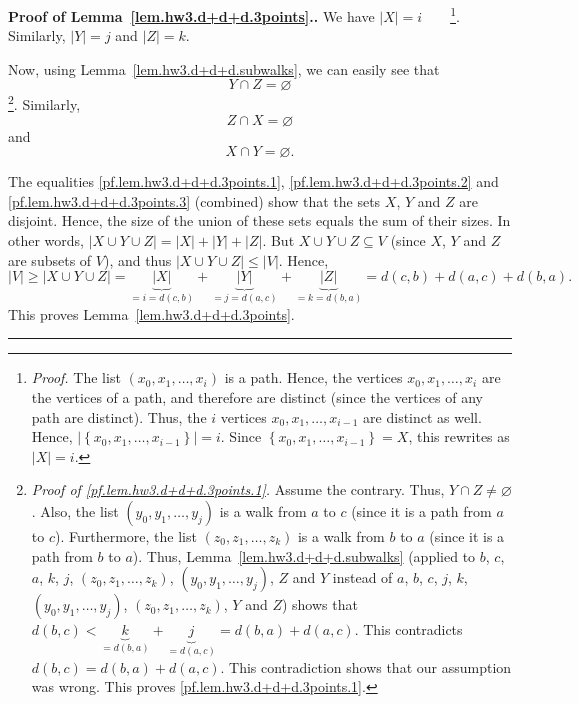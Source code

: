 \documentclass[numbers=enddot,12pt,final,onecolumn,notitlepage]{scrartcl}%
\theoremstyle{definition}
\newenvironment{proof}[1][Proof]{\noindent\textbf{#1.} }{\ \rule{0.5em}{0.5em}}
\newcommand{\set}[1]{\left\{ #1 \right\}}
\newcommand{\abs}[1]{\left| #1 \right|}
\newcommand{\tup}[1]{\left( #1 \right)}
\begin{document}
\begin{proof}[Proof of Lemma~\ref{lem.hw3.d+d+d.3points}.]
We have $\abs{X} = i$\ \ \ \ \footnote{\textit{Proof.}
  The list $\tup{x_0, x_1, \ldots, x_i}$ is a path.
  Hence, the vertices $x_0, x_1, \ldots, x_i$ are the vertices of
  a path, and therefore are distinct (since the vertices of any path
  are distinct).
  Thus, the $i$ vertices $x_0, x_1, \ldots, x_{i-1}$ are distinct as
  well.
  Hence, $\abs{\set{x_0, x_1, \ldots, x_{i-1}}} = i$.
  Since $\set{x_0, x_1, \ldots, x_{i-1}} = X$, this rewrites as
  $\abs{X} = i$.
}.
Similarly, $\abs{Y} = j$ and $\abs{Z} = k$.

Now, using Lemma~\ref{lem.hw3.d+d+d.subwalks}, we can easily see that
\begin{equation}
Y \cap Z = \varnothing
\label{pf.lem.hw3.d+d+d.3points.1}
\end{equation}
\footnote{\textit{Proof of \eqref{pf.lem.hw3.d+d+d.3points.1}.}
  Assume the contrary.
  Thus, $Y \cap Z \neq \varnothing$.
  Also, the list $\tup{y_0, y_1, \ldots, y_j}$ is a walk from $a$ to
  $c$ (since it is a path from $a$ to $c$).
  Furthermore, the list $\tup{z_0, z_1, \ldots, z_k}$ is a walk from
  $b$ to $a$ (since it is a path from $b$ to $a$).
  Thus, Lemma~\ref{lem.hw3.d+d+d.subwalks}
  (applied to $b$, $c$, $a$, $k$, $j$,
  $\tup{z_0, z_1, \ldots, z_k}$, $\tup{y_0, y_1, \ldots, y_j}$, $Z$
  and $Y$ instead of
  $a$, $b$, $c$, $j$, $k$,
  $\tup{y_0, y_1, \ldots, y_j}$, $\tup{z_0, z_1, \ldots, z_k}$, $Y$
  and $Z$)
  shows that
  $d \tup{b, c} < \underbrace{k}_{= d \tup{b, a}}
                  + \underbrace{j}_{= d \tup{a, c}}
                = d \tup{b, a} + d \tup{a, c}$.
  This contradicts $d \tup{b, c} = d \tup{b, a} + d \tup{a, c}$.
  This contradiction shows that our assumption was wrong.
  This proves \eqref{pf.lem.hw3.d+d+d.3points.1}.
}.
Similarly,
\begin{equation}
Z \cap X = \varnothing
\label{pf.lem.hw3.d+d+d.3points.2}
\end{equation}
and
\begin{equation}
X \cap Y = \varnothing .
\label{pf.lem.hw3.d+d+d.3points.3}
\end{equation}

The equalities \eqref{pf.lem.hw3.d+d+d.3points.1},
\eqref{pf.lem.hw3.d+d+d.3points.2} and
\eqref{pf.lem.hw3.d+d+d.3points.3} (combined) show that the sets
$X$, $Y$ and $Z$ are disjoint.
Hence, the size of the union of these sets equals the sum of their
sizes.
In other words, $\abs{X \cup Y \cup Z} = \abs{X} + \abs{Y} + \abs{Z}$.
But $X \cup Y \cup Z \subseteq V$ (since $X$, $Y$ and $Z$ are subsets
of $V$), and thus $\abs{X \cup Y \cup Z} \leq \abs{V}$.
Hence,
\[
\abs{V} \geq \abs{X \cup Y \cup Z}
 = \underbrace{\abs{X}}_{= i = d \tup{c, b}}
   + \underbrace{\abs{Y}}_{= j = d \tup{a, c}}
   + \underbrace{\abs{Z}}_{= k = d \tup{b, a}}
 = d \tup{c, b} + d \tup{a, c} + d \tup{b, a} .
\]
This proves Lemma~\ref{lem.hw3.d+d+d.3points}.
\end{proof}
\end{document}
